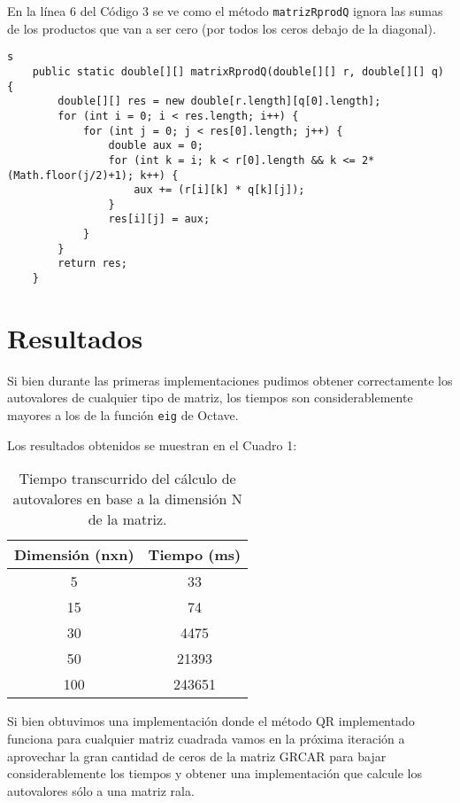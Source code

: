 \documentclass[a4paper,10pt]{article}
\begin{document}
En la línea 6 del Código 3 se ve como el método \texttt{matrizRprodQ}  ignora las sumas de los productos que van a ser cero (por todos los ceros debajo de la diagonal).

\begin{lstlisting}[caption = Optimización del producto entre R y Q]s
	public static double[][] matrixRprodQ(double[][] r, double[][] q) {
		double[][] res = new double[r.length][q[0].length];
		for (int i = 0; i < res.length; i++) {
			for (int j = 0; j < res[0].length; j++) {
				double aux = 0;
				for (int k = i; k < r[0].length && k <= 2*(Math.floor(j/2)+1); k++) {
					aux += (r[i][k] * q[k][j]);
				}
				res[i][j] = aux;
			}
		}
		return res;
	}
\end{lstlisting}

\pagebreak

\section{Resultados}
Si bien durante las primeras implementaciones pudimos obtener correctamente los autovalores de cualquier tipo de matriz, los tiempos son considerablemente mayores a los de la función \texttt{eig} de Octave.

Los resultados obtenidos se muestran en el Cuadro 1:

\begin{center}
\begin{table}[h]
\centering
\begin{tabular}{cc}
\hline
\textbf{Dimensión (nxn)} & \textbf{Tiempo (ms)} \\ \hline
5                  & 33                 \\
15                 & 74                 \\
30                 & 4475                 \\
50                 & 21393                \\
100                & 243651                   
\end{tabular}
\caption[Texto del índice (opcional)]{Tiempo transcurrido del cálculo de autovalores en base a la dimensión N de la matriz.}
\end{table}
\end{center}

Si bien obtuvimos una implementación donde el método QR implementado funciona para cualquier matriz cuadrada vamos en la próxima iteración a aprovechar la gran cantidad de ceros de la matriz GRCAR para bajar considerablemente los tiempos y obtener una implementación que calcule los autovalores sólo a una matriz rala.
\end{document}
